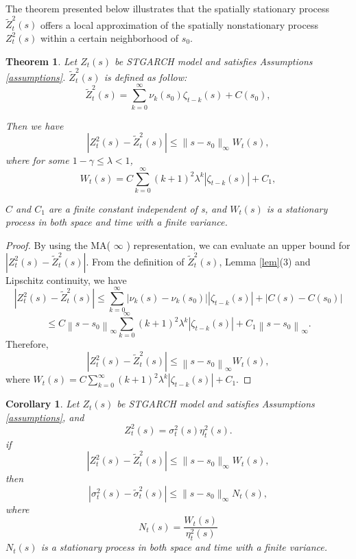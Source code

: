 \documentclass[fleqn,11pt]{article}
\newtheorem{theoremB}{Theorem}[section]
\newtheorem{corollaryB}{Corollary}[section]
\begin{document}
The theorem presented below illustrates that the spatially stationary process $ \widetilde{Z}^2_{t}(s)$ offers a local approximation of the spatially nonstationary process $Z^2_t(s)$ within a certain neighborhood of $s_0$.
\begin{theoremB}\label{spa}
Let $Z_t(s)$ be  STGARCH model  and satisfies Assumptions \ref{assumptions}. $\widetilde{Z}^2_{t}(s)$ is defined as follow:$$ \widetilde{Z}_{t}^2(s) =\sum_{k=0}^{\infty} \nu_k(s_0) \zeta_{t-k}(s) + C(s_0),$$

  Then we have
$$ |Z_t^2(s) - \widetilde{Z}^2_{t}(s)| \leq \|s- s_0\|_{\infty} W_t(s),  $$
where for some $1 - \gamma \leq \lambda < 1$,
$$  W_t(s) = C\sum_{k=0}^{\infty}(k + 1)^2 \lambda^k |\zeta_{t-k}(s)| + C_1, $$

$C$ and $ C_1$ are  a finite constant independent of s, and $W_t(s)$ is a stationary process in both space and time with a finite variance.
\end{theoremB}
\begin{proof}
 By using the MA( $\infty$ ) representation, we can  evaluate an upper bound for $\left|Z_t^2(s) - \widetilde{Z}^2_{t}(s)\right|$. From the definition of $\widetilde{Z}^2_{t}(s)$,  Lemma \ref{lem}(3) and Lipschitz continuity,  we have
$$
\left|Z_t^2(s) - \widetilde{Z}^2_{t}(s)\right|  \leq \sum_{k=0}^{\infty} \left|\nu_k(s)-\nu_k\left(s_0\right)\right|\left|\zeta_{t-k}(s)\right| + \left |C(s) - C(s_0)  \right|$$ 
$$ \leq C\left\|s-s_0\right\|_{\infty} \sum_{k=0}^{\infty} (k + 1)^2 \lambda^k\left|\zeta_{t-k}(s)\right|  + C_1 \left\|s-s_0\right\|_{\infty}.$$
Therefore,
$$\left|Z_t^2(s) - \widetilde{Z}^2_{t}(s)\right|\leq\left\|s-s_0\right\|_{\infty} W_t(s),$$
where $ W_t(s) = C\sum_{k=0}^{\infty}(k + 1)^2 \lambda^k |\zeta_{t-k}(s)| + C_1 $. 
\end{proof}
\begin{corollaryB}\label{cor}
Let $Z_t(s)$ be  STGARCH model  and satisfies  Assumptions \ref{assumptions}, and $$Z_t^2(s) = \sigma_t^2(s) \eta_t^2(s). $$
if $$ |Z_t^2(s) - \widetilde{Z}^2_{t}(s)| \leq \|s- s_0\|_{\infty} W_t(s),  $$
then 
$$ |\sigma_t^2(s) - \widetilde{\sigma}^2_{t}(s)| \leq \|s- s_0\|_{\infty} N_t(s),  $$ where 
$$  N_t(s) = \frac{W_t(s)}{\eta_t^2(s)} $$
 $N_t(s)$ is a stationary process in both space and time with a finite variance.
 \end{corollaryB}
\end{document}
